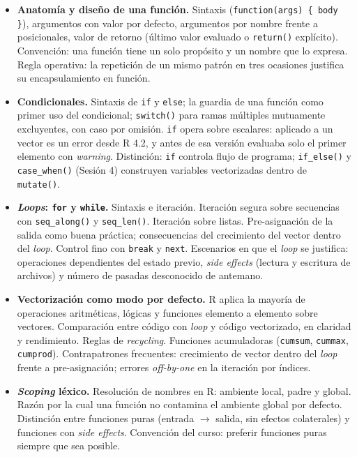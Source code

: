 \documentclass[11pt,letterpaper]{article}
\begin{document}
\begin{itemize}[leftmargin=*, itemsep=2pt]
    \item \textbf{Anatomía y diseño de una función.} Sintaxis (\texttt{function(args) \{ body \}}), argumentos con valor por defecto, argumentos por nombre frente a posicionales, valor de retorno (último valor evaluado o \texttt{return()} explícito). Convención: una función tiene un solo propósito y un nombre que lo expresa. Regla operativa: la repetición de un mismo patrón en tres ocasiones justifica su encapsulamiento en función.
    \item \textbf{Condicionales.} Sintaxis de \texttt{if} y \texttt{else}; la guardia de una función como primer uso del condicional; \texttt{switch()} para ramas múltiples mutuamente excluyentes, con caso por omisión. \texttt{if} opera sobre escalares: aplicado a un vector es un error desde R 4.2, y antes de esa versión evaluaba solo el primer elemento con \textit{warning}. Distinción: \texttt{if} controla flujo de programa; \texttt{if\_else()} y \texttt{case\_when()} (Sesión 4) construyen variables vectorizadas dentro de \texttt{mutate()}.
    \item \textbf{\textit{Loops}: \texttt{for} y \texttt{while}.} Sintaxis e iteración. Iteración segura sobre secuencias con \texttt{seq\_along()} y \texttt{seq\_len()}. Iteración sobre listas. Pre-asignación de la salida como buena práctica; consecuencias del crecimiento del vector dentro del \textit{loop}. Control fino con \texttt{break} y \texttt{next}. Escenarios en que el \textit{loop} se justifica: operaciones dependientes del estado previo, \textit{side effects} (lectura y escritura de archivos) y número de pasadas desconocido de antemano.
    \item \textbf{Vectorización como modo por defecto.} R aplica la mayoría de operaciones aritméticas, lógicas y funciones elemento a elemento sobre vectores. Comparación entre código con \textit{loop} y código vectorizado, en claridad y rendimiento. Reglas de \textit{recycling}. Funciones acumuladoras (\texttt{cumsum}, \texttt{cummax}, \texttt{cumprod}). Contrapatrones frecuentes: crecimiento de vector dentro del \textit{loop} frente a pre-asignación; errores \textit{off-by-one} en la iteración por índices.
    \item \textbf{\textit{Scoping} léxico.} Resolución de nombres en R: ambiente local, padre y global. Razón por la cual una función no contamina el ambiente global por defecto. Distinción entre funciones puras (entrada $\to$ salida, sin efectos colaterales) y funciones con \textit{side effects}. Convención del curso: preferir funciones puras siempre que sea posible.

\end{itemize}
\end{document}

